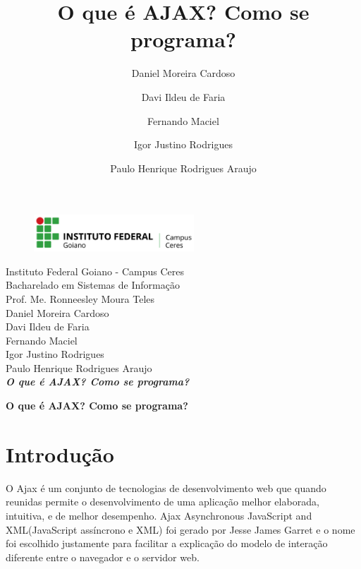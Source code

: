 \documentclass[12pt,a4paper]{article}
\title{O que é AJAX? Como se programa?}
\author{Daniel Moreira Cardoso \and Davi Ildeu de Faria \and Fernando Maciel \and Igor Justino Rodrigues \and Paulo Henrique Rodrigues Araujo}
\begin{document}
\begin{titlepage}
\begin{center}
\begin{figure}[htb]
                
                \label{figura:LogoIF}
        
                \centering
                \includegraphics[width=6cm]{recursos/imagens/logo.png} 
\end{figure}
Instituto Federal Goiano - Campus Ceres\\
Bacharelado em Sistemas de Informação\\
Prof. Me. Ronneesley Moura Teles\\\vspace{0.5cm}
Daniel Moreira Cardoso \\
Davi Ildeu de Faria \\
Fernando Maciel \\
Igor Justino Rodrigues \\
Paulo Henrique Rodrigues Araujo \\
\vspace{5.0cm}
\textit{\textbf{\Large{O que é AJAX? Como se programa? }}}\\\vspace{0.5cm}
\vspace{9.5cm}
\end{center}
\end{titlepage}
\tableofcontents
\newpage
\begin{center}
\textbf{\Large{O que é AJAX? Como se programa?}}\\\vspace{0.5cm}
\end{center}
\section{Introdução}

O Ajax é um conjunto de tecnologias de desenvolvimento web que quando reunidas permite o desenvolvimento de uma aplicação melhor elaborada, intuitiva, e de melhor desempenho. Ajax Asynchronous JavaScript and XML(JavaScript assíncrono e XML) foi gerado por Jesse James Garret e o nome foi escolhido justamente para facilitar a explicação do modelo de interação diferente entre o navegador e o servidor web.
\end{document}
